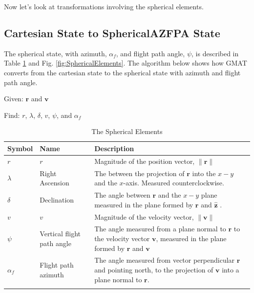 Now let's look at transformations involving the spherical
elements.

\subsection{Cartesian State to SphericalAZFPA State}
\label{Sec:CarttoSphericalAZFPA}  

The spherical state, with azimuth, $\alpha_f$, and flight path
angle, $\psi$, is described in Table \ref{Table:SphericalElements}
and Fig. \ref{fig:SphericalElements}.  The algorithm below shows
how GMAT converts from the cartesian state to the spherical state
with azimuth and flight path angle.

\noindent Given:  $\mathbf{r}$ and $\mathbf{v}$

\noindent Find:  $r$, $\lambda$, $\delta$, $v$, $\psi$, and
$\alpha_f$

\begin{table} \caption{The Spherical Elements}
\centering {}
\begin{tabular}{p{.5 in} p{1.5 in} p{3.5 in}}
  \hline\hline
   Symbol & Name & Description \\
  \hline
  $r$ & $r$ & Magnitude of the position vector, $\|\mathbf{r}\|$ \\
  $\lambda$ & Right Ascension & The between the projection of $\mathbf{r}$ into the $x-y$ and the $x$-axis.  Measured counterclockwise.   \\
%
  $\delta$ & Declination & The angle between $\mathbf{r}$ and the $x-y$ plane measured in the plane formed by $\mathbf{r}$ and $\hat{\mathbf{z}}$ . \\

  $v$ & $v$ & Magnitude of the velocity vector, $\|\mathbf{v}\|$ \\
  $\psi$ & Vertical flight path angle & The angle measured from a plane normal to $\mathbf{r}$ to the velocity vector $\mathbf{v}$, measured in the plane formed by $\mathbf{r}$  and $\mathbf{v}$   \\
  $\alpha_f$ & Flight path azimuth & The angle measured from vector perpendicular  $\mathbf{r}$ and pointing north, to the projection of $\mathbf{v}$ into a plane normal to $\mathbf{r}$. \\
  \hline\hline \label{Table:SphericalElements}
\end{tabular}
\end{table}

